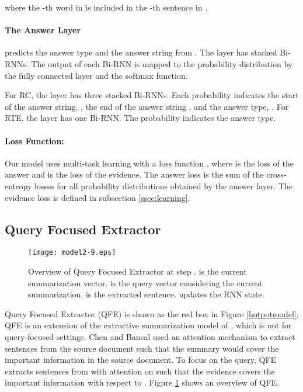 \documentclass[11pt,a4paper]{article}
\theoremstyle{definition}
\begin{document}
	where the -th word in  is included in the -th sentence in . 

	\paragraph{The Answer Layer} predicts the answer type  and the answer string 
	from .
	The layer has stacked Bi-RNNs.
	The output of each Bi-RNN is mapped to the probability distribution
	by the fully connected layer and the softmax function.
	
	For RC, the layer has three stacked Bi-RNNs.
	Each probability indicates the start of the answer string,
	,
	the end of the answer string
	,
	and the answer type,
	.
	For RTE, the layer has one Bi-RNN.
	The probability indicates the answer type.
	
	\paragraph{Loss Function:}
	Our model uses multi-task learning with a loss function
	,
	where  is the loss of the answer and 
	 is the loss of the evidence.
	The answer loss 
	 is the sum of the cross-entropy losses for
	all probability distributions obtained by the answer layer.
	The evidence loss  is defined in subsection \ref{ssec:learning}.
	
	\subsection{Query Focused Extractor}
	\begin{figure}[t]
		\begin{center}
			\texttt{[image: model2-9.eps]} 
			\caption{Overview of Query Focused Extractor at step .  is the current summarization vector.  is the query vector considering the current summarization.  is the extracted sentence.  updates the RNN state.
		}\label{proposedmodel}
		\end{center}	
	\end{figure}
    
    Query Focused Extractor (QFE) is shown as the red box in Figure \ref{hotpotmodel}. 
    QFE is an extension of the extractive summarization model of \citet{fast}, which is not for query-focused settings.
	Chen and Bansal used an attention mechanism to extract sentences from the source document such that the summary would cover the important information in the source document.
	To focus on the query, 
	QFE extracts sentences from  with attention on 
	such that the evidence covers the important information with respect to .
	Figure \ref{proposedmodel} shows an overview of QFE.
	
\end{document}
